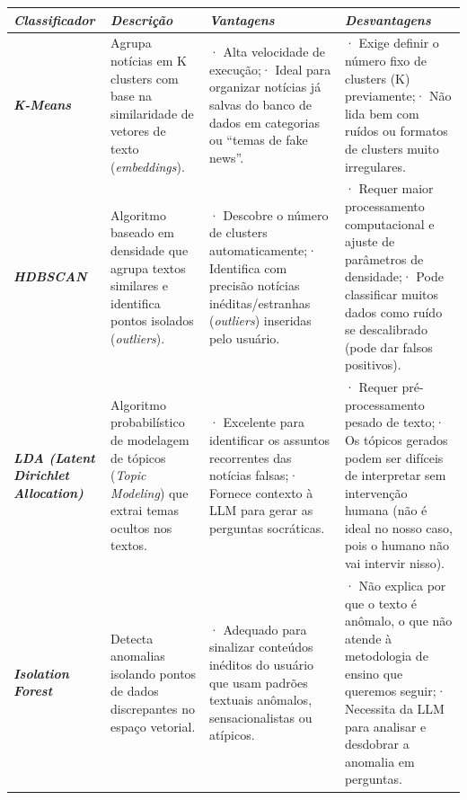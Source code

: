 \documentclass[
  brazilian,
  11pt,
]{article}
\newcounter{none} %
\begin{document}
{\def\LTcaptype{none} %
\begin{longtable}[]{@{}
  >{\raggedright\arraybackslash}p{}
  >{\raggedright\arraybackslash}p{}
  >{\raggedright\arraybackslash}p{}
  >{\raggedright\arraybackslash}p{}@{}}
\toprule\noalign{}
\textbf{\emph{Classificador}} & \textbf{\emph{Descrição}} & \textbf{\emph{Vantagens}} & \textbf{\emph{Desvantagens}} \\
\midrule\noalign{}
\endhead
\bottomrule\noalign{}
\endlastfoot
\textbf{\emph{K-Means}} & Agrupa notícias em K clusters com base na similaridade de vetores de texto (\emph{embeddings}). & · Alta velocidade de execução;\newline · Ideal para organizar notícias já salvas do banco de dados em categorias ou ``temas de fake news''. & · Exige definir o número fixo de clusters (K) previamente;\newline · Não lida bem com ruídos ou formatos de clusters muito irregulares. \\
\textbf{\emph{HDBSCAN}} & Algoritmo baseado em densidade que agrupa textos similares e identifica pontos isolados (\emph{outliers}). & · Descobre o número de clusters automaticamente;\newline · Identifica com precisão notícias inéditas/estranhas (\emph{outliers}) inseridas pelo usuário. & · Requer maior processamento computacional e ajuste de parâmetros de densidade;\newline · Pode classificar muitos dados como ruído se descalibrado (pode dar falsos positivos). \\
\textbf{\emph{LDA (Latent Dirichlet Allocation)}} & Algoritmo probabilístico de modelagem de tópicos (\emph{Topic Modeling}) que extrai temas ocultos nos textos. & · Excelente para identificar os assuntos recorrentes das notícias falsas;\newline · Fornece contexto à LLM para gerar as perguntas socráticas. & · Requer pré-processamento pesado de texto;\newline · Os tópicos gerados podem ser difíceis de interpretar sem intervenção humana (não é ideal no nosso caso, pois o humano não vai intervir nisso). \\
\textbf{\emph{Isolation Forest}} & Detecta anomalias isolando pontos de dados discrepantes no espaço vetorial. & · Adequado para sinalizar conteúdos inéditos do usuário que usam padrões textuais anômalos, sensacionalistas ou atípicos. & · Não explica por que o texto é anômalo, o que não atende à metodologia de ensino que queremos seguir;\newline · Necessita da LLM para analisar e desdobrar a anomalia em perguntas. \\
\end{longtable}
}
\end{document}
